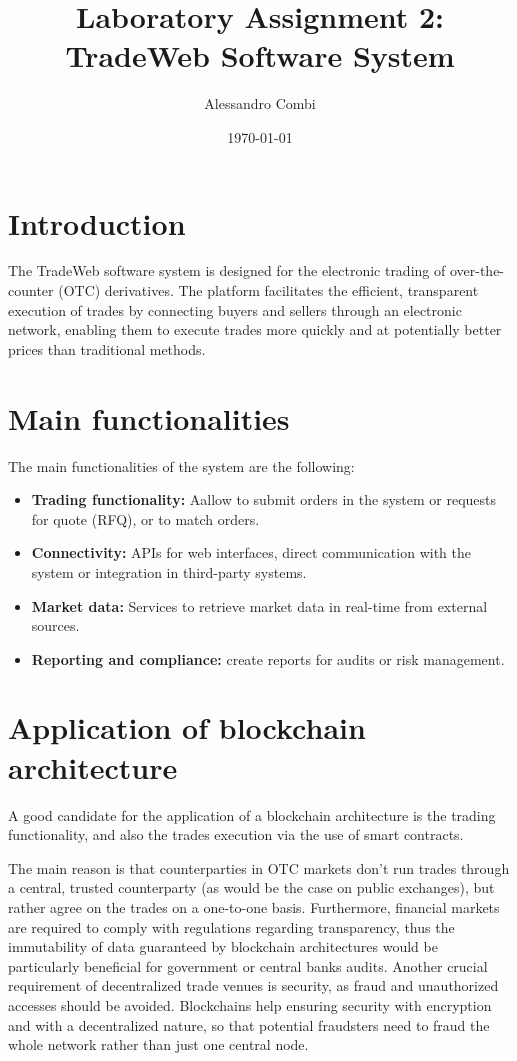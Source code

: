 \documentclass{article}
\title{Laboratory Assignment 2: TradeWeb Software System}
\author{Alessandro Combi}
\date{\today}
\begin{document}
\maketitle

\section*{Introduction}

The TradeWeb software system is designed for the electronic trading of over-the-counter (OTC) derivatives. The platform facilitates the efficient, transparent execution of trades by connecting buyers and sellers through an electronic network, enabling them to execute trades more quickly and at potentially better prices than traditional methods.

\section{Main functionalities}

The main functionalities of the system are the following:
\begin{itemize}
    \item \textbf{Trading functionality:} Aallow to submit orders in the system or requests for quote (RFQ), or to match orders.
    \item \textbf{Connectivity:} APIs for web interfaces, direct communication with the system or integration in third-party systems.
    \item \textbf{Market data:} Services to retrieve market data in real-time from external sources.
    \item \textbf{Reporting and compliance:} create reports for audits or risk management.
\end{itemize}

\section{Application of blockchain architecture}

A good candidate for the application of a blockchain architecture is the trading functionality, and also the trades execution via the use of smart contracts.

The main reason is that counterparties in OTC markets don't run trades through a central, trusted counterparty (as would be the case on public exchanges), but rather agree on the trades on a one-to-one basis. Furthermore, financial markets are required to comply with regulations regarding transparency, thus the immutability of data guaranteed by blockchain architectures would be particularly beneficial for government or central banks audits. Another crucial requirement of decentralized trade venues is security, as fraud and unauthorized accesses should be avoided. Blockchains help ensuring security with encryption and with a decentralized nature, so that potential fraudsters need to fraud the whole network rather than just one central node.
\end{document}
